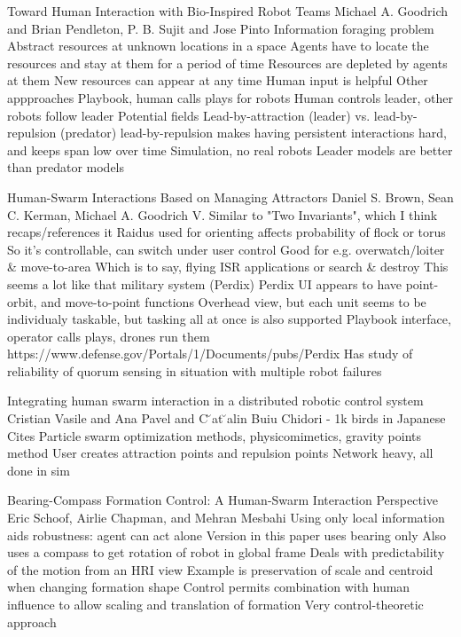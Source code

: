 \citep{goodrich2011toward}
Toward Human Interaction with Bio-Inspired Robot Teams
Michael A. Goodrich and Brian Pendleton, P. B. Sujit and Jose Pinto
	Information foraging problem
		Abstract resources at unknown locations in a space
		Agents have to locate the resources and stay at them for a period of time
		Resources are depleted by agents at them
		New resources can appear at any time
		Human input is helpful
	Other appproaches
		Playbook, human calls plays for robots
		Human controls leader, other robots follow leader
		Potential fields
	Lead-by-attraction (leader) vs. lead-by-repulsion (predator)
		lead-by-repulsion makes having persistent interactions hard, and keeps span low over time
	Simulation, no real robots
		Leader models are better than predator models

\citep{brown2014human}
Human-Swarm Interactions Based on Managing Attractors
Daniel S. Brown, Sean C. Kerman, Michael A. Goodrich
	V. Similar to "Two Invariants", which I think recaps/references it
	Raidus used for orienting affects probability of flock or torus
	So it's controllable, can switch under user control
	Good for e.g. overwatch/loiter \& move-to-area
		Which is to say, flying ISR applications or search \& destroy
	This seems a lot like that military system (Perdix)
		Perdix UI appears to have point-orbit, and move-to-point functions
		Overhead view, but each unit seems to be individualy taskable, but tasking all at once is also supported
			Playbook interface, operator calls plays, drones run them
			https://www.defense.gov/Portals/1/Documents/pubs/Perdix%
	Has study of reliability of quorum sensing in situation with multiple robot failures


	
\citep{vasile2011integrating}
Integrating human swarm interaction in a distributed robotic control system
Cristian Vasile and Ana Pavel and C ̆at ̆alin Buiu
	Chidori - 1k birds in Japanese
	Cites Particle swarm optimization methods, physicomimetics, gravity points method
	User creates attraction points and repulsion points
	Network heavy, all done in sim

\citep{schoof2014bearing}
Bearing-Compass Formation Control: A Human-Swarm Interaction Perspective
Eric Schoof, Airlie Chapman, and Mehran Mesbahi
	Using only local information aids robustness: agent can act alone
	Version in this paper uses bearing only
	Also uses a compass to get rotation of robot in global frame
	Deals with predictability of the motion from an HRI view
		Example is preservation of scale and centroid when changing formation shape
	Control permits combination with human influence to allow scaling and translation of formation
	Very control-theoretic approach

